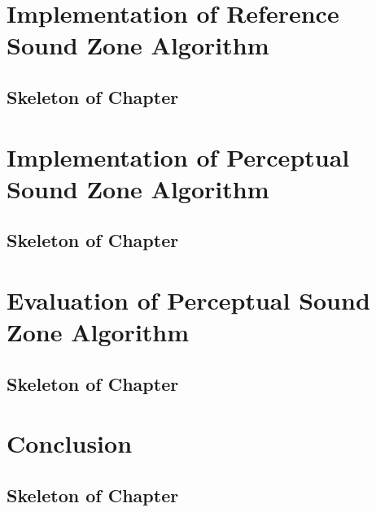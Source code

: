 \documentclass[11pt,twoside,openright,titlepage]{ce}
\begin{document}
\chapter{Implementation of Reference Sound Zone Algorithm}
\label{sec:sound_zones}
\begin{tcolorbox}
\section*{Skeleton of Chapter}

\end{tcolorbox}
\newpage

\newpage

\newpage

\newpage

\newpage


\chapter{Implementation of Perceptual Sound Zone Algorithm}
\label{sec:perceptual_sound_zones}
\begin{tcolorbox}
\section*{Skeleton of Chapter}

\end{tcolorbox}
\newpage

\newpage

\newpage


\chapter{Evaluation of Perceptual Sound Zone Algorithm}
\begin{tcolorbox}
\section*{Skeleton of Chapter}

\end{tcolorbox}

\chapter{Conclusion}
\begin{tcolorbox}
\section*{Skeleton of Chapter}
\newpage

\end{tcolorbox}




\appendix
\end{document}

